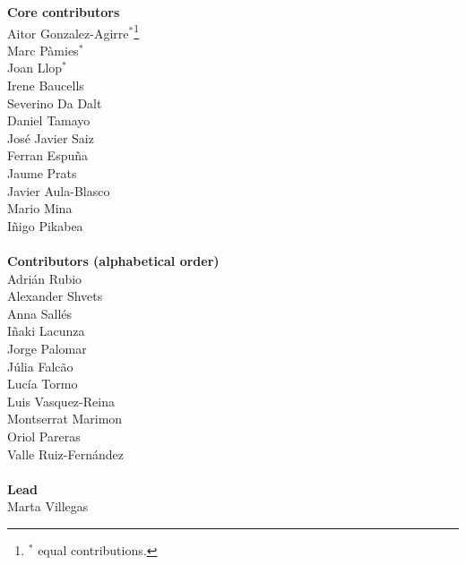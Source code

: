 \noindent\textbf{Core contributors}\\
Aitor Gonzalez-Agirre$^*$\footnote{$^*$ equal contributions.}\\
Marc Pàmies$^*$\\
Joan Llop$^*$\\
Irene Baucells\\
Severino Da Dalt\\
Daniel Tamayo\\
José Javier Saiz\\
Ferran Espuña\\
Jaume Prats\\
Javier Aula-Blasco\\
Mario Mina\\
Iñigo Pikabea\\
\\
\noindent\textbf{Contributors (alphabetical order)}\\
Adrián Rubio\\
Alexander Shvets\\
Anna Sallés\\
Iñaki Lacunza\\
Jorge Palomar\\
Júlia Falcão\\
Lucía Tormo\\
Luis Vasquez-Reina\\
Montserrat Marimon\\
Oriol Pareras\\
Valle Ruiz-Fernández\\
\\
\noindent\textbf{Lead}\\
Marta Villegas